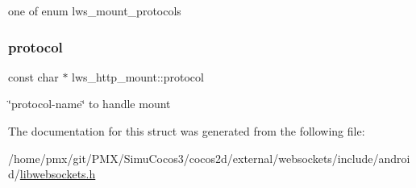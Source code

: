one of enum lws\+\_\+mount\+\_\+protocols \mbox{\label{structlws__http__mount_a5f32a7b69a080d9df9d96490523cf55d}} 
\subsubsection{\texorpdfstring{protocol}{protocol}}
{\footnotesize\ttfamily const char $\ast$ lws\+\_\+http\+\_\+mount\+::protocol}

\char`\"{}protocol-\/name\char`\"{} to handle mount 

The documentation for this struct was generated from the following file\+:\begin{DoxyCompactItemize}
\item 
/home/pmx/git/\+P\+M\+X/\+Simu\+Cocos3/cocos2d/external/websockets/include/android/\hyperlink{_2cocos2d_2external_2websockets_2include_2android_2libwebsockets_8h}{libwebsockets.\+h}\end{DoxyCompactItemize}
